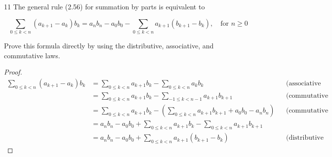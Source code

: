 \documentclass[a4paper,12pt]{article}
\theoremstyle{definition}
\newenvironment{problems}{\begin{list}{}{\renewcommand{\makelabel}[1]{\textbf{##1}\hfil}}}{\end{list}}
\begin{document}
\begin{problems}
    \item[11] The general rule (2.56) for summation by parts is equivalent to
    
    $$
    \sum_{0\leq k <n}(a_{k+1}-a_k)b_k = a_n b_n - a_0 b_0 - \sum_{0\leq k <n}a_{k+1}(b_{k+1}-b_k),\quad \text{for }n\geq 0
    $$

    
    Prove this formula directly by  using the distributive, associative, and commutative laws.

    \begin{proof}
        \begin{align*}
            \sum_{0\leq k <n}(a_{k+1}-a_k)b_k &= \sum_{0\leq k <n} a_{k+1}b_k - \sum_{0\leq k <n} a_kb_k &&\text{(associative law)}\\
            &=\sum_{0\leq k <n} a_{k+1}b_k - \sum_{-1\leq k <n-1} a_{k+1}b_{k+1} &&\text{(commutative law)}\\
            &=\sum_{0\leq k <n} a_{k+1}b_k - \left(\sum_{0\leq k <n} a_{k+1}b_{k+1} + a_0b_0 -a_nb_n \right)&&\text{(commutative law)}\\
            &= a_nb_n - a_0b_0 +\sum_{0\leq k <n} a_{k+1}b_k - \sum_{0\leq k <n} a_{k+1}b_{k+1} \\
            &= a_nb_n - a_0b_0 + \sum_{0\leq k <n}a_{k+1}(b_{k+1}-b_k) &&\text{(distributive law)}
        \end{align*}
        
    \end{proof}


\end{problems}
\end{document}
